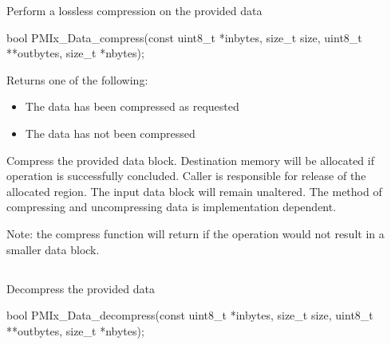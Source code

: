 Perform a lossless compression on the provided data

\format

\cspecificstart
\begin{codepar}
bool
PMIx_Data_compress(const uint8_t *inbytes, size_t size,
                   uint8_t **outbytes, size_t *nbytes);
\end{codepar}
\cspecificend

\begin{arglist}
\end{arglist}

Returns one of the following:
\begin{itemize}
\item {} The data has been compressed as requested
\item {} The data has not been compressed
\end{itemize}

\descr

Compress the provided data block. Destination memory
will be allocated if operation is successfully concluded. Caller
is responsible for release of the allocated region. The input
data block will remain unaltered.  
The method of compressing and uncompressing data is implementation dependent. 

Note: the compress function will return  if the operation
would not result in a smaller data block.



\subsection{}

\summary

Decompress the provided data

\format

\cspecificstart
\begin{codepar}
bool
PMIx_Data_decompress(const uint8_t *inbytes, size_t size,
                     uint8_t **outbytes, size_t *nbytes);
\end{codepar}
\cspecificend

